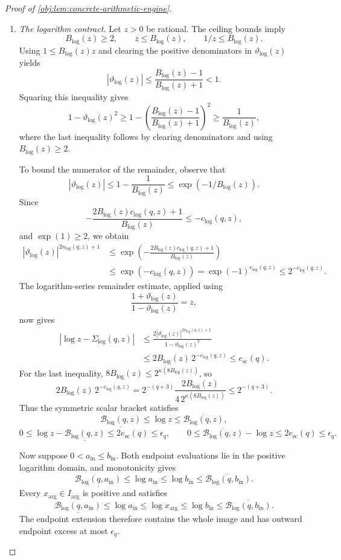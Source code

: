 \documentclass[11pt]{article}
\begin{document}
\begin{proof}[Proof of \cref{obj:lem:concrete-arithmetic-engine}]
\begin{enumerate}
\item \emph{The logarithm contract.}
Let \(z>0\) be rational. The ceiling bounds imply
\[
B_{\log}(z)\ge2,\qquad
z\le B_{\log}(z),\qquad
1/z\le B_{\log}(z).
\]
Using \(1\le B_{\log}(z)z\) and clearing the positive denominators in
\(\vartheta_{\log}(z)\) yields
\[
|\vartheta_{\log}(z)|
 \le\frac{B_{\log}(z)-1}{B_{\log}(z)+1}<1.
\]
Squaring this inequality gives
\[
1-\vartheta_{\log}(z)^2
 \ge1-\left(\frac{B_{\log}(z)-1}{B_{\log}(z)+1}\right)^2
 \ge\frac1{B_{\log}(z)},
\]
where the last inequality follows by clearing denominators and using
\(B_{\log}(z)\ge2\).

To bound the numerator of the remainder, observe that
\[
|\vartheta_{\log}(z)|
 \le1-\frac1{B_{\log}(z)}
 \le\exp(-1/B_{\log}(z)).
\]
Since
\[
-\frac{2B_{\log}(z)c_{\log}(q,z)+1}{B_{\log}(z)}
 \le-c_{\log}(q,z),
\]
and \(\exp(1)\ge2\), we obtain
\[
\begin{split}
|\vartheta_{\log}(z)|^{2n_{\log}(q,z)+1}
&\le
 \exp\!\left(-\frac{2B_{\log}(z)c_{\log}(q,z)+1}
                  {B_{\log}(z)}\right)\\
&\le\exp(-c_{\log}(q,z))
 =\exp(-1)^{c_{\log}(q,z)}
 \le2^{-c_{\log}(q,z)}.
\end{split}
\]
The logarithm-series remainder estimate, applied using
\[
\frac{1+\vartheta_{\log}(z)}{1-\vartheta_{\log}(z)}=z,
\]
now gives
\[
\begin{split}
|\log z-\Sigma_{\log}(q,z)|
&\le
 \frac{2|\vartheta_{\log}(z)|^{2n_{\log}(q,z)+1}}
      {1-\vartheta_{\log}(z)^2}\\
&\le2B_{\log}(z)\,2^{-c_{\log}(q,z)}
 \le e_{\mathrm{sc}}(q).
\end{split}
\]
For the last inequality,
\(8B_{\log}(z)\le2^{\kappa(8B_{\log}(z))}\), so
\[
2B_{\log}(z)\,2^{-c_{\log}(q,z)}
 =
2^{-(q+3)}
 \frac{2B_{\log}(z)}
      {4\,2^{\kappa(8B_{\log}(z))}}
 \le2^{-(q+3)}.
\]
Thus the symmetric scalar bracket satisfies
\[
\underline{\mathcal B_{\log}(q,z)}
 \le\log z\le\overline{\mathcal B_{\log}(q,z)},
\]
\[
0\le\log z-\underline{\mathcal B_{\log}(q,z)}
 \le2e_{\mathrm{sc}}(q)\le\epsilon_q,
\qquad
0\le\overline{\mathcal B_{\log}(q,z)}-\log z
 \le2e_{\mathrm{sc}}(q)\le\epsilon_q.
\]

Now suppose \(0<a_{\mathrm{in}}\le b_{\mathrm{in}}\). Both endpoint evaluations lie in the positive logarithm domain, and monotonicity gives
\[
\underline{\mathcal B_{\log}(q,a_{\mathrm{in}})}
 \le\log a_{\mathrm{in}}
 \le\log b_{\mathrm{in}}
 \le\overline{\mathcal B_{\log}(q,b_{\mathrm{in}})}.
\]
Every \(x_{\mathrm{arg}}\in I_{\mathrm{arg}}\) is positive and satisfies
\[
\underline{\mathcal B_{\log}(q,a_{\mathrm{in}})}
 \le\log a_{\mathrm{in}}
 \le\log x_{\mathrm{arg}}
 \le\log b_{\mathrm{in}}
 \le\overline{\mathcal B_{\log}(q,b_{\mathrm{in}})}.
\]
The endpoint extension therefore contains the whole image and has outward endpoint excess at most \(\epsilon_q\).


\end{enumerate}
\end{proof}
\end{document}

